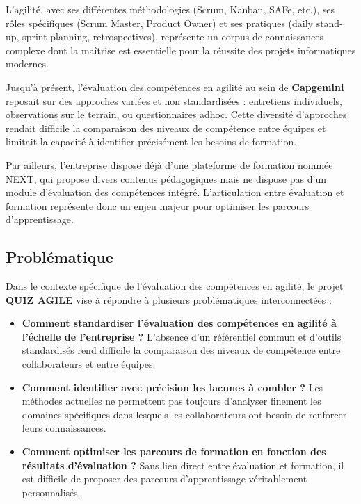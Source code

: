 \documentclass[12pt,a4paper]{report}
\begin{document}
L'agilité, avec ses différentes méthodologies (Scrum, Kanban, SAFe, etc.), ses rôles spécifiques (Scrum Master, Product Owner) et ses pratiques (daily stand-up, sprint planning, retrospectives), représente un corpus de connaissances complexe dont la maîtrise est essentielle pour la réussite des projets informatiques modernes.

Jusqu'à présent, l'évaluation des compétences en agilité au sein de \textbf{Capgemini} reposait sur des approches variées et non standardisées : entretiens individuels, observations sur le terrain, ou questionnaires adhoc. Cette diversité d'approches rendait difficile la comparaison des niveaux de compétence entre équipes et limitait la capacité à identifier précisément les besoins de formation.

Par ailleurs, l'entreprise dispose déjà d'une plateforme de formation nommée NEXT, qui propose divers contenus pédagogiques mais ne dispose pas d'un module d'évaluation des compétences intégré. L'articulation entre évaluation et formation représente donc un enjeu majeur pour optimiser les parcours d'apprentissage.

\subsection{Problématique}

Dans le contexte spécifique de l'évaluation des compétences en agilité, le projet \textbf{QUIZ AGILE} vise à répondre à plusieurs problématiques interconnectées :

\begin{itemize}
\item \textbf{Comment standardiser l'évaluation des compétences en agilité à l'échelle de l'entreprise ?} L'absence d'un référentiel commun et d'outils standardisés rend difficile la comparaison des niveaux de compétence entre collaborateurs et entre équipes.
\item \textbf{Comment identifier avec précision les lacunes à combler ?} Les méthodes actuelles ne permettent pas toujours d'analyser finement les domaines spécifiques dans lesquels les collaborateurs ont besoin de renforcer leurs connaissances.
\item \textbf{Comment optimiser les parcours de formation en fonction des résultats d'évaluation ?} Sans lien direct entre évaluation et formation, il est difficile de proposer des parcours d'apprentissage véritablement personnalisés.
\end{itemize}
\end{document}
